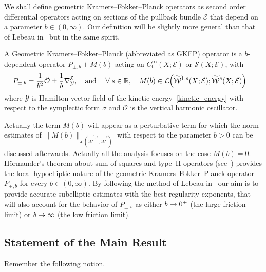 \documentclass[AHL,Unicode,longabstracts]{cedram}
\makeatletter
\newcommand{\R}{\mathbb{R}}
\newcommand{\clW}{\mathcal{W}}
\newcommand{\clY}{\mathcal{Y}}
\newcommand{\clO}{\mathcal{O}}
\newcommand{\clE}{\mathcal{E}}
\newcommand{\clS}{\mathcal{S}}
\newcommand{\clL}{\mathcal{L}}
\newcommand{\fkH}{\mathfrak{H}}
\let\oldtilde\tilde
\renewcommand*{\tilde}[1]{\mathchoice{\widetilde{#1}}{\widetilde{#1}}{\oldtilde{#1}}{\oldtilde{#1}}}
\let\oldforall\forall
\renewcommand*{\forall}{\mathrel{\oldforall}}
\let\originalleft\left
\let\originalright\right
\renewcommand{\left}{\mathopen{}\mathclose\bgroup\originalleft}
\renewcommand{\right}{\aftergroup\egroup\originalright}
\renewcommand*{\to}{\mathchoice{\longrightarrow}{\rightarrow}{\rightarrow}{\rightarrow}}
\let\oldmapsto\mapsto
\renewcommand*{\mapsto}{\mathchoice{\longmapsto}{\oldmapsto}{\oldmapsto}{\oldmapsto}}
\let\save@mathaccent\mathaccent
\newcommand*\if@single[3]{%
  \setbox0\hbox{${\mathaccent"0362{#1}}^H$}%
  \setbox2\hbox{${\mathaccent"0362{\kern0pt#1}}^H$}%
  \ifdim\ht0=\ht2 #3\else #2\fi
  }
\newcommand*\rel@kern[1]{\kern#1\dimexpr\macc@kerna}
\newcommand*\widebar[1]{\@ifnextchar^{{\wide@bar{#1}{0}}}{\wide@bar{#1}{1}}}
\newcommand*\wide@bar[2]{\if@single{#1}{\wide@bar@{#1}{#2}{1}}{\wide@bar@{#1}{#2}{2}}}
\newcommand*\wide@bar@[3]{%
  \begingroup
  \def\mathaccent##1##2{%
    \let\mathaccent\save@mathaccent
    \if#32 \let\macc@nucleus\first@char \fi
    \setbox\z@\hbox{$\macc@style{\macc@nucleus}_{}$}%
    \setbox\tw@\hbox{$\macc@style{\macc@nucleus}{}_{}$}%
    \dimen@\wd\tw@
    \advance\dimen@-\wd\z@
    \divide\dimen@ 3
    \@tempdima\wd\tw@
    \advance\@tempdima-\scriptspace
    \divide\@tempdima 10
    \advance\dimen@-\@tempdima
    \ifdim\dimen@>\z@ \dimen@0pt\fi
    \rel@kern{0.6}\kern-\dimen@
    \if#31
      \overline{\rel@kern{-0.6}\kern\dimen@\macc@nucleus\rel@kern{0.4}\kern\dimen@}%
      \advance\dimen@0.4\dimexpr\macc@kerna
      \let\final@kern#2%
      \ifdim\dimen@<\z@ \let\final@kern1\fi
      \if\final@kern1 \kern-\dimen@\fi
    \else
      \overline{\rel@kern{-0.6}\kern\dimen@#1}%
    \fi
  }%
  \macc@depth\@ne
  \let\math@bgroup\@empty \let\math@egroup\macc@set@skewchar
  \mathsurround\z@ \frozen@everymath{\mathgroup\macc@group\relax}%
  \macc@set@skewchar\relax
  \let\mathaccentV\macc@nested@a
  \if#31
    \macc@nested@a\relax111{#1}%
  \else
    \def\gobble@till@marker##1\endmarker{}%
    \futurelet\first@char\gobble@till@marker#1\endmarker
    \ifcat\noexpand\first@char A\else
      \def\first@char{}%
    \fi
    \macc@nested@a\relax111{\first@char}%
  \fi
  \endgroup
}
\let\oldbar\bar
\renewcommand*{\bar}[1]{{\mathchoice{\widebar{#1}}{\widebar{#1}}{\widebar{#1}}{\oldbar{#1}}}}
\makeatother
\begin{document}
We shall define geometric Kramers--Fokker--Planck operators as second order differential operators acting on sections of the pullback bundle $\clE$ that depend on a parameter $b \in (0,\infty)$. Our definition will be slightly more general than that of Lebeau in~\cite{Leb1,Leb2} but in the same spirit.

\begin{defi}\label{de:GKFPO}
A Geometric Kramers--Fokker--Planck (abbreviated as GKFP) operator is a $b$-dependent operator $P_{\pm,b}+M(b)$ acting on $C^\infty_{0}(X; \clE)$ or $\clS(X;\clE)$, with
\begin{align*}
P_{\pm,b} = \frac{1}{b^2} \clO \pm \frac{1}{b} \nabla^{\clE}_\clY,
\quad\text{and}\quad& \forall s\in \R,\quad M(b)\in \clL\left(\tilde{\clW}^{1,s}(X;\clE);\tilde{\clW}^{s}(X;\clE)\right)
\end{align*}
where $\clY$ is Hamilton vector field of the kinetic energy~\eqref{kinetic_energy} with respect to the symplectic form $\sigma$ and $\clO$ is the vertical harmonic oscillator.
\end{defi}

Actually the term $M(b)$ will appear as a perturbative term for which the norm estimates of $\|M(b)\|_{\clL(\widetilde{\clW}^{1,s};\widetilde{\clW}^{s})}$ with respect to the parameter $b>0$ can be discussed afterwards. Actually all the analysis focuses on the case $M(b)=0$. H\"ormander's theorem about sum of squares and type~II operators (see~\cite{Hor67}) provides the local hypoelliptic nature of the geometric Kramers--Fokker--Planck operator $P_{\pm, b}$ for every $b \in (0,\infty)$. By following the method of Lebeau in~\cite{Leb1,Leb2} our aim is to provide accurate subelliptic estimates with the best regularity exponents, that will also account for the behavior of $P_{\pm,b}$ as either $b \to 0^+$ (the large friction limit) or $b \to \infty$ (the low friction limit).


\subsection{Statement of the Main Result}

Remember the following notion.
\end{document}
